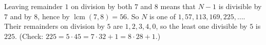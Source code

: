 Leaving remainder $1$ on division by both $7$ and $8$ means that $N-1$ is divisible by $7$ and by $8$, hence by $\operatorname{lcm}(7,8)=56$. So $N$ is one of $1,57,113,169,225,\dots$. Their remainders on division by $5$ are $1,2,3,4,0$, so the least one divisible by $5$ is $\boxed{225}$. (Check: $225=5\cdot45=7\cdot32+1=8\cdot28+1$.)
